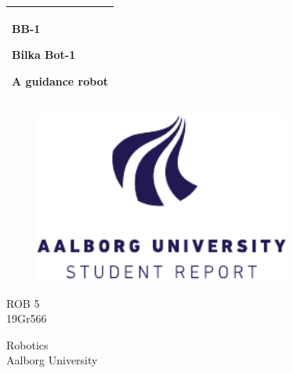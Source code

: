 \begin{titlepage}
    \addtolength{\hoffset}{0.5\evensidemargin-0.5\oddsidemargin}
    \noindent%
    \begin{tabular}{@{}p{\textwidth}@{}}
        \toprule[2pt]
        \midrule
        \vspace{0.2cm}
        \begin{center}
            \Huge{\textbf{
                BB-1
            }}
        \end{center}
        \begin{center}
            \LARGE{
                Bilka Bot-1
            }
        \end{center}
        \begin{center}
            \Large{
                A guidance robot
            }
        \end{center}
        
        \vspace{0.2cm}\\
        \midrule
        \toprule[2pt]
    \end{tabular}
    \begin{figure}[H]
        \centering
        \includegraphics[width=0.75\textwidth]{figures/aau_logo_en.pdf}
        \label{fig:Frontpage}
    \end{figure}
    \vspace{1 cm}
    \begin{center}
        \large{
            ROB 5 
        }
        \\
        \vspace{0.2cm}
        \Large{
            19Gr566
        }
    \end{center}
    \vfill
    \begin{center}
        Robotics\\Aalborg University
    \end{center}
\end{titlepage}
